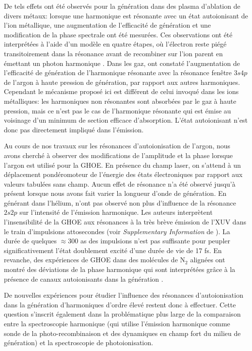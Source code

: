 De tels effets ont été observés pour la génération dans des plasma d'ablation de divers métaux: lorsque une harmonique est résonante avec un état autoionisant de l'ion métallique, une augmentation de l'efficacité de génération  et une modification de la phase spectrale  ont été mesurées. Ces observations ont été interprétées à l'aide d'un modèle en quatre étapes, où l'électron reste piégé transitoirement dans la résonance avant de recombiner sur l'ion parent en émettant un photon harmonique . Dans les gaz,  ont constaté l'augmentation de l'efficacité de génération de l'harmonique résonante avec la résonance fenêtre $3s4p$ de l'argon à haute pression de génération, par rapport aux autres harmoniques. Cependant le mécanisme proposé ici est différent de celui invoqué dans les ions métalliques: les harmoniques non résonantes sont absorbées par le gaz à haute pression, mais ce n'est pas le cas de l'harmonique résonante qui est émise au voisinage d'un minimum de section efficace d'absorption. L'état autoionisant n'est donc pas directement impliqué dans l'émission. 

Au cours de nos travaux sur les résonances d'autoionisation de l'argon, nous avons cherché à observer des modifications de l'amplitude et la phase lorsque l'argon est utilisé pour la GHOE. En présence du champ laser, on s'attend à un déplacement pondéromoteur de l'énergie des états électroniques par rapport aux valeurs tabulées sans champ. Aucun effet de résonance n'a été observé jusqu'à présent lorsque nous avons fait varier la longueur d'onde de génération. En générant dans l'hélium,  n'ont pas observé non plus d'influence de la résonance $2s2p$ sur l'intensité de l'émission harmonique. Les auteurs interprètent l'insensibilité de la GHOE aux résonances à la très brève émission de l'XUV dans le train d'impulsions attosecondes (voir \textit{Supplementary Information} de ). La durée de quelques $\approx 300$ as des impulsions n'est pas suffisante pour peupler significativement l'état doublement excité d'une durée de vie de 17 fs. En revanche, des expériences de GHOE dans des molécules de N$_2$ alignées ont montré des déviations de la phase harmonique qui sont interprétées grâce à la présence de canaux autoionisants dans la génération .

De nouvelles expériences pour étudier l'influence des résonances d'autoionisation dans la génération d'harmoniques d'ordre élevé restent donc à effectuer. Cette question s'inscrit également dans la problématique plus large de la comparaison entre la spectroscopie harmonique (qui utilise l'émission harmonique comme sonde de la photo-recombinaison et des dynamiques en champ fort du milieu de génération) et la spectroscopie de photoionisation.

